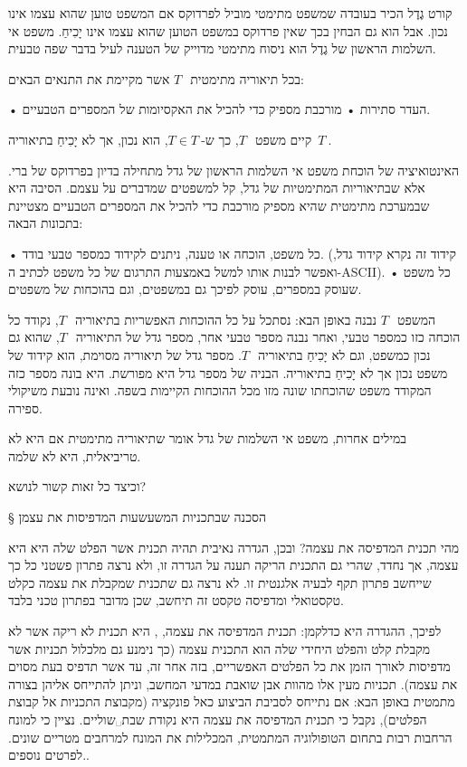 קורט גֶדֶל הכיר בעובדה שמשפט מתימטי מוביל לפרדוקס אם המשפט טוען שהוא עצמו אינו נכון. אבל הוא גם הבחין בכך שאין פרדוקס במשפט הטוען שהוא עצמו אינו יָכִיחַ. משפט אי השלמות הראשון של גֶדֶל הוא ניסוח מתימטי מדוייק של הטענה לעיל בדבר שפה טבעית.

\begin{mybox}
בכל תיאוריה מתימטית~$ T~$ אשר מקיימת את התנאים הבאים:
\begin{itemize}
• העדר סתירות
• מורכבת מספיק כדי להכיל את האקסיומות של המספרים הטבעיים.
\end{itemize}
קיים משפט~$ T~$, כך ש-$ T∈T~$, הוא נכון, אך לא יָכִיחַ בתיאוריה~$ T~$.
\end{mybox}
האינטואיציה של הוכחת משפט אי השלמות הראשון של גדל מתחילה בדיון בפרדוקס של ברי. אלא שבתיאוריות המתימטיות של גדל, קל למשפטים שמדברים על עצמם. הסיבה היא שבמערכת מתימטית שהיא מספיק מורכבת כדי להכיל את המספרים הטבעיים מצטיינת בתכונות הבאה:
\begin{itemize}
• כל משפט, הוכחה או טענה, ניתנים לקידוד כמספר טבעי בודד. (קידוד זה נקרא קידוד גדל, ואפשר לבנות אותו למשל באמצעות התרגום של כל משפט לכתיב ה-ASCII).
• כל משפט שעוסק במספרים, עוסק לפיכך גם במשפטים, וגם בהוכחות של משפטים.
\end{itemize}
 המשפט~$ T~$ נבנה באופן הבא: נסתכל על כל ההוכחות האפשריות בתיאוריה~$ T~$, נקודד כל הוכחה כזו כמספר טבעי, ואחר נבנה מספר טבעי אחר, מספר גדל של התיאוריה~$ T~$, שהוא גם נכון כמשפט, וגם לא יָכִיחַ בתיאוריה~$ T~$. מספר גדל של תיאוריה מסוימת, הוא קידוד של משפט נכון אך לא יָכִיחַ בתיאוריה. הבניה של מספר גדל היא מפורשת. היא בונה מספר כזה המקודד משפט שהוכחתו שונה מזו מכל ההוכחות הקיימות בשפה. ואינה נובעת משיקולי ספירה.

 במילים אחרות, משפט אי השלמות של גדל אומר שתיאוריה מתימטית אם היא לא טריביאלית, היא לא שלמה.

וכיצד כל זאות קשור לנושא?
\newpage

§ הסכנה שבתכניות המשעשעות המדפיסות את עצמן

מהי תכנית המדפיסה את עצמה? ובכן, הגדרה נאיבית תהיה תכנית אשר הפלט שלה היא היא עצמה, אך נחדד, שהרי גם התכנית הריקה תענה על הגדרה זו, ולא נרצה פתרון פשטני כל כך שייחשב פתרון תקף לבעיה אלגנטית זו. לא נרצה גם שתכנית שמקבלת את עצמה כקלט טקסטואלי ומדפיסה טקסט זה תיחשב, שכן מדובר בפתרון טכני בלבד.

לפיכך, ההגדרה היא כדלקמן: תכנית המדפיסה את עצמה, , היא תכנית לא ריקה אשר לא מקבלת קלט והפלט היחידי שלה הוא התכנית עצמה (כך נימנע גם מלכלול תכניות אשר מדפיסות לאורך הזמן את כל הפלטים האפשריים, בזה אחר זה, עד אשר תדפיס בעת מסוים את עצמה). תכניות מעין אלו מהוות אבן שואבת במדעי המחשב, וניתן להתייחס אליהן בצורה מתמטית באופן הבא: אם נתייחס לסביבת הביצוע כאל פונקציה (מקבוצת התכניות אל קבוצת הפלטים), נקבל כי תכנית המדפיסה את עצמה היא נקודת שבת␣שוליים{. נציין כי למונח הרחבות רבות בתחום הטופולוגיה המתמטית, המכלילות את המונח למרחבים מטריים שונים. לפרטים נוספים.}.

